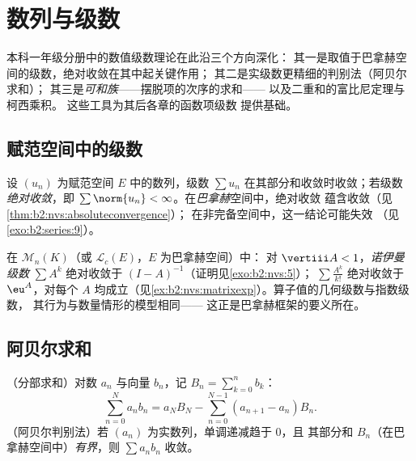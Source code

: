 \chapter{数列与级数}\label{ch:b2:series}

本科一年级分册中的数值级数理论在此沿三个方向深化：
其一是取值于巴拿赫空间的级数，绝对收敛在其中起关键作用；
其二是实级数更精细的判别法（阿贝尔求和）；
其三是\emph{可和族}——摆脱项的次序的求和——
以及二重和的富比尼定理与柯西乘积。
这些工具为其后各章的函数项级数
提供基础。

\section{赋范空间中的级数}

\begin{definition}\label{def:b2:series:def}
设 $(u_n)$ 为赋范空间 $E$ 中的数列，级数 $\sum u_n$
在其部分和收敛时收敛；若级数
\emph{绝对收敛}，即
$\sum \norm{u_n} < \infty$。在\emph{巴拿赫}空间中，绝对收敛
蕴含收敛（见\cref{thm:b2:nvs:absoluteconvergence}）；
在非完备空间中，这一结论可能失效
（见\cref{exo:b2:series:9}）。
\end{definition}

\begin{example}\label{ex:b2:series:neumann}
在 $\mathcal{M}_n(K)$（或 $\mathcal{L}_c(E)$，$E$ 为巴拿赫空间）中：
对 $\vertiii A < 1$，\emph{诺伊曼级数} $\sum A^k$
绝对收敛于 $(I - A)^{-1}$（证明见\cref{exo:b2:nvs:5}）；
$\sum \frac{A^k}{k!}$ 绝对收敛于 $\eu^A$，对每个 $A$
均成立（见\cref{ex:b2:nvs:matrixexp}）。算子值的几何级数与指数级数，
其行为与数量情形的模型相同——
这正是巴拿赫框架的要义所在。
\end{example}

\section{阿贝尔求和}

\begin{theorem}[阿贝尔求和与判别法]\label{thm:b2:series:abel}
（分部求和）对数 $a_n$ 与向量 $b_n$，记 $B_n
= \sum_{k=0}^{n} b_k$：
\[
\sum_{n=0}^{N} a_n b_n
= a_N B_N - \sum_{n=0}^{N-1} (a_{n+1} - a_n) B_n .
\]
（阿贝尔判别法）若 $(a_n)$ 为实数列，单调递减趋于 $0$，且
其部分和 $B_n$（在巴拿赫空间中）\emph{有界}，则
$\sum a_n b_n$ 收敛。
\end{theorem}

